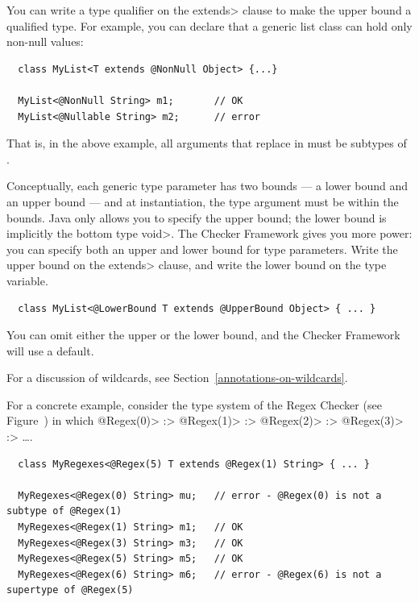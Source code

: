 You can write a type qualifier on the \<extends> clause to make the upper
bound a qualified type.  For example, you can declare that a generic list class can hold only non-null values:

\begin{Verbatim}
  class MyList<T extends @NonNull Object> {...}

  MyList<@NonNull String> m1;       // OK
  MyList<@Nullable String> m2;      // error
\end{Verbatim}

That is, in the above example, all
arguments that replace  in  must be subtypes of
.



Conceptually, each generic type parameter has two bounds --- a lower bound
and an upper bound --- and at instantiation, the type argument must be
within the bounds.  Java only allows you to specify the upper bound; the
lower bound is implicitly the bottom type \<void>.  The Checker Framework
gives you more power:  you can specify both an upper and lower bound for
type parameters.
Write the upper bound on the \<extends> clause, and
write the lower bound on the type variable.

\begin{Verbatim}
  class MyList<@LowerBound T extends @UpperBound Object> { ... }
\end{Verbatim}

You can omit either the upper or the lower bound, and the Checker Framework
will use a default.

For a discussion of wildcards, see Section~\ref{annotations-on-wildcards}.

For a concrete example, consider the type system of the Regex Checker (see
Figure~) in which
 \<@Regex(0)> :>
 \<@Regex(1)> :>
 \<@Regex(2)> :>
 \<@Regex(3)> :> \ldots.

\begin{Verbatim}
  class MyRegexes<@Regex(5) T extends @Regex(1) String> { ... }

  MyRegexes<@Regex(0) String> mu;   // error - @Regex(0) is not a subtype of @Regex(1)
  MyRegexes<@Regex(1) String> m1;   // OK
  MyRegexes<@Regex(3) String> m3;   // OK
  MyRegexes<@Regex(5) String> m5;   // OK
  MyRegexes<@Regex(6) String> m6;   // error - @Regex(6) is not a supertype of @Regex(5)
\end{Verbatim}

